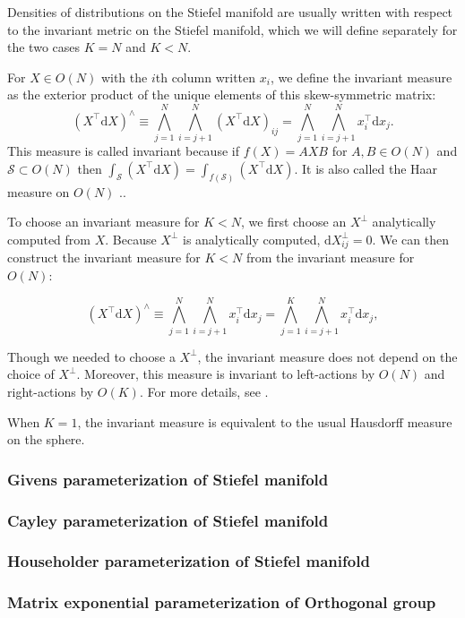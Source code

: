 \documentclass[11pt]{article}
\newcommand{\dv}[1]{\mathrm{d}{#1}}
\begin{document}
Densities of distributions on the Stiefel manifold are usually written with respect to the invariant metric on the Stiefel manifold, which we will define separately for the two cases $K=N$ and $K < N$.

For $X \in O(N)$ with the $i$th column written $x_i$, we define the invariant measure as the exterior product of the unique elements of this skew-symmetric matrix:
\[
  (X^\top \dv{X})^\wedge \equiv \bigwedge_{j=1}^N \bigwedge_{i=j+1}^N (X^\top \dv{X})_{ij} = \bigwedge_{j=1}^N \bigwedge_{i=j+1}^N x_i^\top \dv{x}_j.
\]
This measure is called invariant because if $f(X) = A X B$ for $A,B \in O(N)$ and $\mathcal{S} \subset O(N)$ then $\int_{\mathcal{S}} (X^\top \dv{X}) = \int_{f(\mathcal{S})} (X^\top \dv{X})$.
It is also called the Haar measure on $O(N)$ \cite{muirhead2009aspects}..

To choose an invariant measure for $K < N$, we first choose an $X^\perp$ analytically computed from $X$.
Because $X^\perp$ is analytically computed, $\dv{X^\perp_{ij}} = 0$.
We can then construct the invariant measure for $K<N$ from the invariant measure for $O(N)$:

\[
  (X^\top \dv{X})^\wedge \equiv \bigwedge_{j=1}^N \bigwedge_{i=j+1}^N x_i^\top \dv{x}_j = \bigwedge_{j=1}^K \bigwedge_{i=j+1}^N x_i^\top \dv{x}_j,
\]

Though we needed to choose a $X^\perp$, the invariant measure does not depend on the choice of $X^\perp$.
Moreover, this measure is invariant to left-actions by $O(N)$ and right-actions by $O(K)$.
For more details, see \cite{muirhead2009aspects}.

When $K=1$, the invariant measure is equivalent to the usual Hausdorff measure on the sphere.

\subsubsection{Givens parameterization of Stiefel manifold}

\subsubsection{Cayley parameterization of Stiefel manifold}

\subsubsection{Householder parameterization of Stiefel manifold}

\subsubsection{Matrix exponential parameterization of Orthogonal group}
\end{document}
